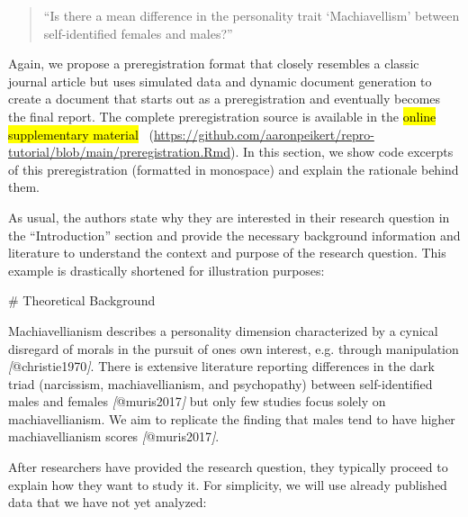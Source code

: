 \documentclass[psych,tutorial,accept,moreauthors,pdftex]{Definitions/mdpi}
\newenvironment{Shaded}{\begin{snugshade}}{\end{snugshade}}
\newcommand{\CommentTok}[1]{\textcolor[rgb]{0.56,0.35,0.01}{\textit{#1}}}
\newcommand{\FunctionTok}[1]{\textcolor[rgb]{0.00,0.00,0.00}{#1}}
\newcommand{\NormalTok}[1]{#1}
\newcommand{\OtherTok}[1]{\textcolor[rgb]{0.56,0.35,0.01}{#1}}
\begin{document}
\begin{paracol}{2}
\begin{quote}
``Is there a mean difference in the personality trait `Machiavellism'
between self-identified females and males?''
\end{quote}

Again, we propose a preregistration format that closely resembles a
classic journal article but uses simulated data and dynamic document
generation to create a document that starts out as a preregistration and
eventually becomes the final report. The complete preregistration source
is available in the \hl{online supplementary material}
~(\url{https://github.com/aaronpeikert/repro-tutorial/blob/main/preregistration.Rmd}). In this section, we show code excerpts of this
preregistration (formatted in monospace) and explain the rationale
behind them.

As usual, the authors state why they are interested in their research
question in the ``Introduction'' section and provide the necessary
background information and literature to understand the context and
purpose of the research question. This example is drastically shortened
for illustration purposes:

\vspace{+6pt}
\end{paracol}
\nointerlineskip
\begin{adjustwidth}{0.5cm}{0cm} 
\begin{Shaded}
\begin{Highlighting}[]
\FunctionTok{\# Theoretical Background}

\NormalTok{Machiavellianism describes a personality dimension characterized by a}
\NormalTok{cynical disregard of morals in the pursuit of one\textquotesingle{}s own interest, e.g.}
\NormalTok{through manipulation }\CommentTok{[}\OtherTok{@christie1970}\CommentTok{]}\NormalTok{. There is extensive literature reporting}
\NormalTok{differences in the dark triad (narcissism, machiavellianism, and psychopathy)}
\NormalTok{between self{-}identified males and females }\CommentTok{[}\OtherTok{@muris2017}\CommentTok{]}\NormalTok{ but only few studies}
\NormalTok{focus solely on machiavellianism. We aim to replicate the finding that males}
\NormalTok{tend to have higher machiavellianism scores }\CommentTok{[}\OtherTok{@muris2017}\CommentTok{]}\NormalTok{.}
\end{Highlighting}
\end{Shaded}
\end{adjustwidth}
\begin{paracol}{2}
\switchcolumn


After researchers have provided the research question, they typically
proceed to explain how they want to study it. For simplicity, we will
use already published data that we have not yet analyzed:

\vspace{+6pt}
\end{paracol}
\end{document}
